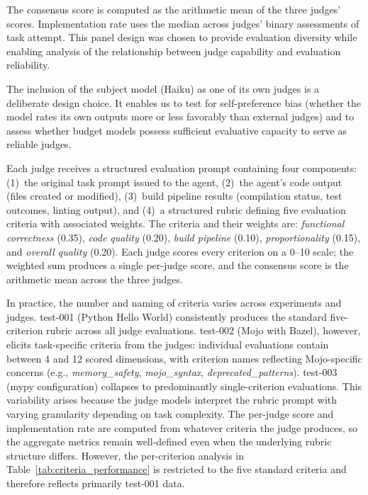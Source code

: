 \documentclass[11pt]{article}
\begin{document}
The consensus score is computed as the arithmetic mean of the three judges'
scores. Implementation rate uses the median across judges' binary assessments
of task attempt. This panel design was chosen to provide evaluation diversity
while enabling analysis of the relationship between judge capability and
evaluation reliability.

The inclusion of the subject model (Haiku) as one of its own judges is a
deliberate design choice. It enables us to test for self-preference bias
(whether the model rates its own outputs more or less favorably than external
judges) and to assess whether budget models possess sufficient evaluative
capacity to serve as reliable judges.

Each judge receives a structured evaluation prompt containing four components:
(1)~the original task prompt issued to the agent, (2)~the agent's code output
(files created or modified), (3)~build pipeline results (compilation status,
test outcomes, linting output), and (4)~a structured rubric defining five
evaluation criteria with associated weights. The criteria and their weights are:
\emph{functional correctness} (0.35), \emph{code quality} (0.20),
\emph{build pipeline} (0.10), \emph{proportionality} (0.15), and
\emph{overall quality} (0.20). Each judge scores every criterion on a 0--10
scale; the weighted sum produces a single per-judge score, and the consensus
score is the arithmetic mean across the three judges.

In practice, the number and naming of criteria varies across experiments and
judges. test-001 (Python Hello World) consistently produces the standard
five-criterion rubric across all judge evaluations. test-002 (Mojo with Bazel),
however, elicits task-specific criteria from the judges: individual evaluations
contain between 4 and 12 scored dimensions, with criterion names reflecting
Mojo-specific concerns (e.g., \emph{memory\_safety}, \emph{mojo\_syntax},
\emph{deprecated\_patterns}). test-003 (mypy configuration) collapses to
predominantly single-criterion evaluations. This variability arises because the
judge models interpret the rubric prompt with varying granularity depending on
task complexity. The per-judge score and implementation rate are computed from
whatever criteria the judge produces, so the aggregate metrics remain
well-defined even when the underlying rubric structure differs. However, the
per-criterion analysis in Table~\ref{tab:criteria_performance} is restricted to
the five standard criteria and therefore reflects primarily test-001 data.
\end{document}
